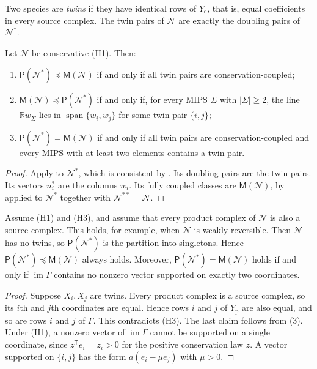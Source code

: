 \documentclass[11pt,a4paper]{report}
\providecommand{\R}{\mathbb{R}}
\newcommand{\Net}{\mathcal{N}}
\newcommand{\Ye}{Y_{\mathrm e}}
\newcommand{\Yp}{Y_{\mathrm p}}
\newcommand{\spn}{\operatorname{span}}
\newcommand{\Pre}{\mathsf{P}}
\newcommand{\Mips}{\mathsf{M}}
\newcommand{\refi}{\preceq}
\begin{document}
Two species are \emph{twins} if they have identical rows of \(\Ye\), that is, equal coefficients in every source
complex. The twin pairs of \(\Net\) are exactly the doubling pairs of \(\Net^*\).

\begin{corollary}\label{cor:species}
Let \(\Net\) be conservative (H1). Then:
\begin{enumerate}
\item \(\Pre(\Net^*)\refi\Mips(\Net)\) if and only if all twin pairs are conservation-coupled;
\item \(\Mips(\Net)\refi\Pre(\Net^*)\) if and only if, for every MIPS \(\Sigma\) with \(|\Sigma|\ge2\), the line
\(\R w_\Sigma\) lies in \(\spn\{w_i,w_j\}\) for some twin pair \(\{i,j\}\);
\item \(\Pre(\Net^*)=\Mips(\Net)\) if and only if all twin pairs are conservation-coupled and every MIPS with at least
two elements contains a twin pair.
\end{enumerate}
\end{corollary}
\begin{proof}
Apply  to \(\Net^*\), which is consistent by . Its doubling pairs are the twin
pairs. Its vectors \(n^*_i\) are the columns \(w_i\). Its fully coupled classes are \(\Mips(\Net)\), by
 applied to \(\Net^*\) together with \(\Net^{**}=\Net\).
\end{proof}

\begin{corollary}\label{cor:wr}
Assume (H1) and (H3), and assume that every product complex of \(\Net\) is also a source complex. This holds, for
example, when \(\Net\) is weakly reversible. Then \(\Net\) has no twins, so \(\Pre(\Net^*)\) is the partition into
singletons. Hence \(\Pre(\Net^*)\refi\Mips(\Net)\) always holds. Moreover, \(\Pre(\Net^*)=\Mips(\Net)\) holds if and
only if \(\operatorname{im}\Gamma\) contains no nonzero vector supported on exactly two coordinates.
\end{corollary}
\begin{proof}
Suppose \(X_i,X_j\) are twins. Every product complex is a source complex, so its \(i\)th and \(j\)th coordinates are
equal. Hence rows \(i\) and \(j\) of \(\Yp\) are also equal, and so are rows \(i\) and \(j\) of \(\Gamma\). This
contradicts (H3). The last claim follows from (3). Under (H1), a nonzero vector of
\(\operatorname{im}\Gamma\) cannot be supported on a single coordinate, since \(z^{\mathsf T}e_i=z_i>0\) for the
positive conservation law \(z\). A vector supported on \(\{i,j\}\) has the form \(a(e_i-\mu e_j)\) with \(\mu>0\).
\end{proof}
\end{document}
